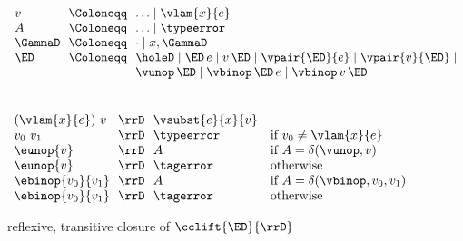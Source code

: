 \begin{flushleft}

\\
$\begin{array}{l@{~~}c@{~~}l}
  v & \Coloneqq & \ldots \mid \vlam{x}{e}
\\
  A & \Coloneqq & \ldots \mid \typeerror
\\
  \GammaD & \Coloneqq & \cdot \mid x,\GammaD
\\
  \ED & \Coloneqq & \holeD \mid \ED\,e \mid v\,\ED \mid \vpair{\ED}{e} \mid \vpair{v}{\ED} \mid
\\ & & \vunop\,\ED \mid \vbinop\,\ED\,e \mid \vbinop\,v\,\ED
\end{array}$

\medskip
{}
\begin{mathpar}






\end{mathpar}

\medskip
{}\\
$\begin{array}{l@{~~}c@{~~}l l}
  (\vlam{x}{e})~v & \rrD & \vsubst{e}{x}{v} &
\\
  v_0~v_1 & \rrD & \typeerror & \mbox{if $v_0 \neq \vlam{x}{e}$}
\\
  \eunop{v} & \rrD & A & \mbox{if $A = \delta(\vunop, v)$}
\\
  \eunop{v} & \rrD & \tagerror & \mbox{otherwise}
\\
  \ebinop{v_0}{v_1} & \rrD & A & \mbox{if $A = \delta(\vbinop, v_0, v_1)$}
\\
  \ebinop{v_0}{v_1} & \rrD & \tagerror & \mbox{otherwise}
\end{array}$

\medskip
{} reflexive, transitive closure of $\cclift{\ED}{\rrD}$

\end{flushleft}

